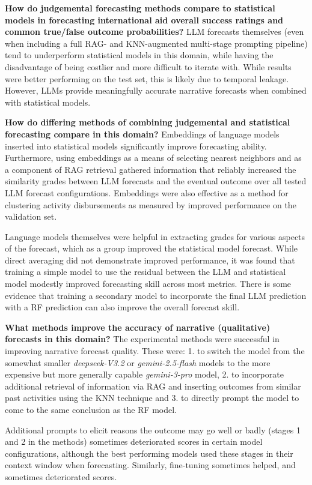 \textbf{How do judgemental forecasting methods compare to statistical models in forecasting international aid overall success ratings and common true/false outcome probabilities?}
LLM forecasts themselves (even when including a full RAG- and KNN-augmented multi-stage prompting pipeline) tend to underperform statistical models in this domain, while having the disadvantage of being costlier and more difficult to iterate with. While results were better performing on the test set, this is likely due to temporal leakage. However, LLMs provide meaningfully accurate narrative forecasts when combined with statistical models.


\textbf{How do differing methods of combining judgemental and statistical forecasting compare in this domain?}
Embeddings of language models inserted into statistical models significantly improve forecasting ability. Furthermore, using embeddings as a means of selecting nearest neighbors and as a component of RAG retrieval gathered information that reliably increased the similarity grades between LLM forecasts and the eventual outcome over all tested LLM forecast configurations. Embeddings were also effective as a method for clustering activity disbursements as measured by improved performance on the validation set.

Language models themselves were helpful in extracting grades for various aspects of the forecast, which as a group improved the statistical model forecast. While direct averaging did not demonstrate improved performance, it was found that training a simple model to use the residual between the LLM and statistical model modestly improved forecasting skill across most metrics. There is some evidence that training a secondary model to incorporate the final LLM prediction with a RF prediction can also improve the overall forecast skill.

\textbf{What methods improve the accuracy of narrative (qualitative) forecasts in this domain?}
The experimental methods were successful in improving narrative forecast quality. These were: 1. to switch the model from the somewhat smaller \emph{deepseek-V3.2} or \emph{gemini-2.5-flash} models to the more expensive but more generally capable \emph{gemini-3-pro} model,  2. to incorporate additional retrieval of information via RAG and inserting outcomes from similar past activities using the KNN technique and 3. to directly prompt the model to come to the same conclusion as the RF model.

Additional prompts to elicit reasons the outcome may go well or badly (stages 1 and 2 in the methods) sometimes deteriorated scores in certain model configurations, although the best performing models used these stages in their context window when forecasting. Similarly, fine-tuning sometimes helped, and sometimes deteriorated scores.

